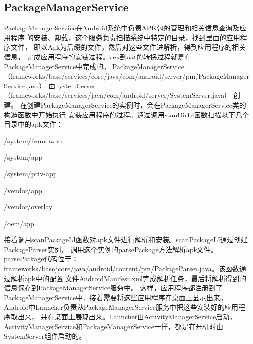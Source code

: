\subsection{PackageManagerService}
PackageManagerService在Android系统中负责APK包的管理和相关信息查询及应用程序
的安装、卸载，这个服务负责扫描系统中特定的目录，找到里面的应用程序文件，
即以Apk为后缀的文件，然后对这些文件进解析，得到应用程序的相关信息，
完成应用程序的安装过程。dex到oat的转换过程就是在PackageManagerService中完成的。
PackageManagerService（frameworks/base/services/core/java/com/android/server/pm/PackageManagerService.java）
由SystemServer（frameworks/base/services/java/com/android/server/SystemServer.java）
创建。
在创建PackageManagerService的实例时，会在PackageManagerService类的构造函数中开始执行
安装应用程序的过程。通过调用scanDirLI函数扫描以下几个目录中的apk文件：

/system/framework

/system/app

/system/priv-app

/vendor/app

/vendor/overlay

/oem/app

接着调用scanPackageLI函数对apk文件进行解析和安装。scanPackageLI通过创建PackageParser实例，
调用这个实例的parsePackage方法解析apk文件。parsePackage代码位于：
frameworks/base/core/java/android/content/pm/PackageParser.java。该函数通过解析apk中的配置
文件AndroidManifest.xml完成解析任务，最后将解析得到的信息保存到PackageManagerService服务中。
这样，应用程序都注册到了PackageManagerService中，接着需要将这些应用程序在桌面上显示出来。
Android中Launcher负责从PackageManagerService服务中把这些安装好的应用程序取出来，
并在桌面上展现出来。Launcher由ActivityManagerService启动，
ActivityManagerService和PackageManagerService一样，都是在开机时由SystemServer组件启动的。

